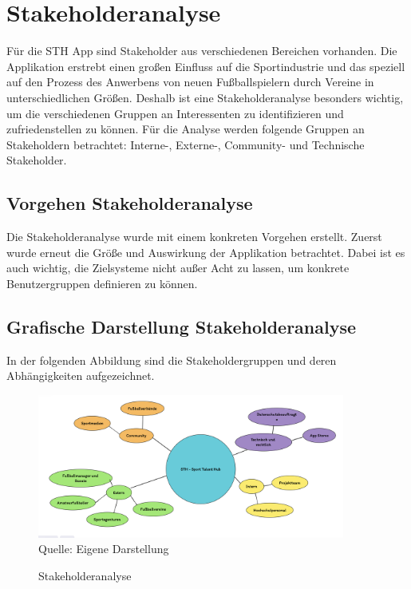 \chapter{Stakeholderanalyse}

Für die STH App sind Stakeholder aus verschiedenen Bereichen vorhanden.
Die Applikation erstrebt einen großen Einfluss auf die Sportindustrie und das speziell auf den Prozess des Anwerbens von neuen Fußballspielern durch Vereine in unterschiedlichen Größen.
Deshalb ist eine Stakeholderanalyse besonders wichtig, um die verschiedenen Gruppen an Interessenten zu identifizieren und zufriedenstellen zu können.
Für die Analyse werden folgende Gruppen an Stakeholdern betrachtet: Interne-, Externe-, Community- und Technische Stakeholder.

\section{Vorgehen Stakeholderanalyse}

Die Stakeholderanalyse wurde mit einem konkreten Vorgehen erstellt.
Zuerst wurde erneut die Größe und Auswirkung der Applikation betrachtet.
Dabei ist es auch wichtig, die Zielsysteme nicht außer Acht zu lassen, um konkrete Benutzergruppen definieren zu können.


\section{Grafische Darstellung Stakeholderanalyse}

In der folgenden Abbildung sind die Stakeholdergruppen und deren Abhängigkeiten aufgezeichnet.


\begin{figure}[H]
	\caption[Stakeholderanalyse]{Stakeholderanalyse}
	\includegraphics[width=0.9\textwidth]{assets/figures/Stakeholderanalyse.png}
    \\
	Quelle: Eigene Darstellung
\end{figure}


